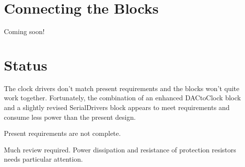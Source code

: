 \documentclass[a4paper,12pt]{article}
\begin{document}
\section{Connecting the Blocks}

Coming soon!

\section{Status}

The clock drivers don't match present requirements and the blocks won't quite work together. Fortunately, the combination of an enhanced DACtoClock block and a slightly revised SerialDrivers block appears to meet requirements and consume less power than the present design.

Present requirements are not complete.

Much review required. Power dissipation and resistance of protection resistors needs particular attention.
\end{document}
